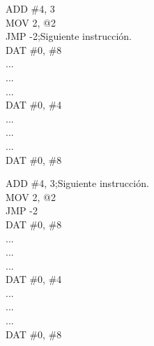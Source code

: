 \begin{tcolorbox}
    ADD \#4, 3\\
    MOV 2, @2\\
    JMP -2\phantom{................};Siguiente instrucción. \\
    DAT \#0, \#8\\
    ...\\
    ...\\
    ...\\
    DAT \#0, \#4\\
    ...\\
    ...\\
    ...\\
    DAT \#0, \#8
\end{tcolorbox}

\begin{tcolorbox}
    ADD \#4, 3\phantom{................};Siguiente instrucción. \\
    MOV 2, @2\\
    JMP -2\\
    DAT \#0, \#8\\
    ...\\
    ...\\
    ...\\
    DAT \#0, \#4\\
    ...\\
    ...\\
    ...\\
    DAT \#0, \#8
\end{tcolorbox}